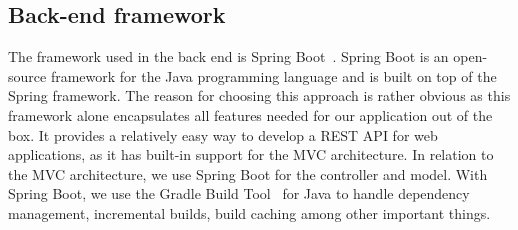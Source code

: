 \subsection{Back-end framework}\label{subsec:back-end-framework}

The framework used in the back end is Spring Boot~\cite{springboot2024}.
Spring Boot is an open-source framework for the Java programming language and is built on top of the Spring framework.
The reason for choosing this approach is rather obvious as this framework alone encapsulates all features needed for our
application out of the box.
It provides a relatively easy way to develop a REST API for web applications, as it has built-in support for the MVC
architecture.
In relation to the MVC architecture, we use Spring Boot for the controller and model.
With Spring Boot, we use the Gradle Build Tool~\cite{gradle2024} for Java to handle dependency management, incremental
builds, build caching among other important things.
